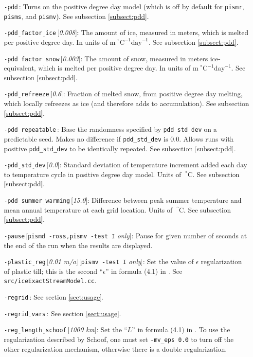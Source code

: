 \documentclass[11pt,final]{amsart}
\renewcommand{\t}[1]{\texttt{#1}}
\newcommand{\eps}{\epsilon}
\newcommand{\rawopt}[1]{\vspace{1mm}\noindent \Large\texttt{-#1}\normalsize}
\newcommand{\opt}[1]{\rawopt{#1}\,:\quad}
\newcommand{\optdef}[2]{\rawopt{#1}\,[\textsl{#2}]:\quad}
\newcommand{\optrestrict}[2]{\rawopt{#1}\,[\texttt{#2} \textsl{only}]:\quad}
\newcommand{\optdefrestrict}[3]{\rawopt{#1}\,[\textsl{#2}]\,[\texttt{#3} \textsl{only}]:\quad}
\newcommand{\und}{$\underline{\,\,\,}$}
\begin{document}
\opt{pdd}  Turns on the positive degree day model (which is off by default for \verb|pismr|, \verb|pisms|, and \verb|pismv|).  See subsection \ref{subsect:pdd}.

\optdef{pdd\und factor\und ice}{0.008}  The amount of ice, measured in meters, which is melted per positive degree day.  In units of $\text{m}\!\phantom{|}^\circ\text{C}^{-1}\text{day}^{-1}$.  See subsection \ref{subsect:pdd}.

\optdef{pdd\und factor\und snow}{0.003}  The amount of snow, measured in meters ice-equivalent, which is melted per positive degree day.  In units of $\text{m}\phantom{|}^\circ\text{C}^{-1}\text{day}^{-1}$.  See subsection \ref{subsect:pdd}.

\optdef{pdd\und refreeze}{0.6}  Fraction of melted snow, from positive degree day melting, which locally refreezes as ice (and therefore adds to accumulation).  See subsection \ref{subsect:pdd}.

\opt{pdd\und repeatable}  Base the randomness specified by \verb|pdd_std_dev| on a predictable seed.  Makes no difference if \verb|pdd_std_dev| is 0.0.  Allows runs with positive \verb|pdd_std_dev| to be identically repeated.  See subsection \ref{subsect:pdd}.

\optdef{pdd\und std\und dev}{0.0}  Standard deviation of temperature increment added each day to temperature cycle in positive degree day model.  Units of $\phantom{|}^\circ\text{C}$.  See subsection \ref{subsect:pdd}.

\optdef{pdd\und summer\und warming}{15.0}  Difference between peak summer temperature and mean annual temperature at each grid location.  Units of $\phantom{|}^\circ\text{C}$.  See subsection \ref{subsect:pdd}.

\optrestrict{pause}{pismd -ross,pismv -test I}    Pause for given number of seconds at the end of the run when the results are displayed.

\optdefrestrict{plastic\und reg}{0.01 m/a}{pismv -test I}    Set the value of $\eps$ regularization of plastic till; this is the second ``$\eps$'' in formula (4.1) in \cite{SchoofStream}.  See \t{src/iceExactStreamModel.cc}.

\opt{regrid}  See section \ref{sect:usage}.

\opt{regrid\und vars}  See section \ref{sect:usage}.

\optdef{reg\und length\und schoof}{1000 km}  Set the ``$L$'' in formula (4.1) in \cite{SchoofStream}.  To use the regularization described by Schoof, one must set \verb|-mv_eps 0.0| to turn off the other regularization mechanism, otherwise there is a double regularization.
\end{document}
